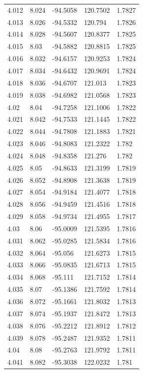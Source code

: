 \begin{tabular}{lllll}
4.012 & 8.024 & -94.5058 & 120.7502 & 1.7827 \\
4.013 & 8.026 & -94.5332 & 120.794 & 1.7826 \\
4.014 & 8.028 & -94.5607 & 120.8377 & 1.7825 \\
4.015 & 8.03 & -94.5882 & 120.8815 & 1.7825 \\
4.016 & 8.032 & -94.6157 & 120.9253 & 1.7824 \\
4.017 & 8.034 & -94.6432 & 120.9691 & 1.7824 \\
4.018 & 8.036 & -94.6707 & 121.013 & 1.7823 \\
4.019 & 8.038 & -94.6982 & 121.0568 & 1.7823 \\
4.02 & 8.04 & -94.7258 & 121.1006 & 1.7822 \\
4.021 & 8.042 & -94.7533 & 121.1445 & 1.7822 \\
4.022 & 8.044 & -94.7808 & 121.1883 & 1.7821 \\
4.023 & 8.046 & -94.8083 & 121.2322 & 1.782 \\
4.024 & 8.048 & -94.8358 & 121.276 & 1.782 \\
4.025 & 8.05 & -94.8633 & 121.3199 & 1.7819 \\
4.026 & 8.052 & -94.8908 & 121.3638 & 1.7819 \\
4.027 & 8.054 & -94.9184 & 121.4077 & 1.7818 \\
4.028 & 8.056 & -94.9459 & 121.4516 & 1.7818 \\
4.029 & 8.058 & -94.9734 & 121.4955 & 1.7817 \\
4.03 & 8.06 & -95.0009 & 121.5395 & 1.7816 \\
4.031 & 8.062 & -95.0285 & 121.5834 & 1.7816 \\
4.032 & 8.064 & -95.056 & 121.6273 & 1.7815 \\
4.033 & 8.066 & -95.0835 & 121.6713 & 1.7815 \\
4.034 & 8.068 & -95.111 & 121.7152 & 1.7814 \\
4.035 & 8.07 & -95.1386 & 121.7592 & 1.7814 \\
4.036 & 8.072 & -95.1661 & 121.8032 & 1.7813 \\
4.037 & 8.074 & -95.1937 & 121.8472 & 1.7813 \\
4.038 & 8.076 & -95.2212 & 121.8912 & 1.7812 \\
4.039 & 8.078 & -95.2487 & 121.9352 & 1.7811 \\
4.04 & 8.08 & -95.2763 & 121.9792 & 1.7811 \\
4.041 & 8.082 & -95.3038 & 122.0232 & 1.781 \\

\end{tabular}
